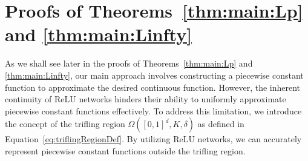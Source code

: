 \documentclass[nohyperref]{article}
\theoremstyle{plain}
\theoremstyle{definition}
\theoremstyle{remark}
\begin{document}




\newpage
\appendix
\onecolumn

\cleardoublepage
\vspace*{-10pt}
\tableofcontents

\newpage
\section{Proofs of Theorems~\ref{thm:main:Lp} and \ref{thm:main:Linfty}}
\label{sec:proof:main}





As we shall see later in the proofs of Theorems~\ref{thm:main:Lp} and \ref{thm:main:Linfty}, our main approach involves constructing a piecewise constant function to approximate the desired continuous function. However, the inherent continuity of ReLU networks hinders their ability to uniformly approximate piecewise constant functions effectively. To address this limitation, we introduce the concept of the trifling region $\Omega([0,1]^d,K,\delta)$ as defined in Equation~\eqref{eq:triflingRegionDef}. By utilizing ReLU networks, we can accurately represent piecewise constant functions outside the trifling region.
\end{document}
